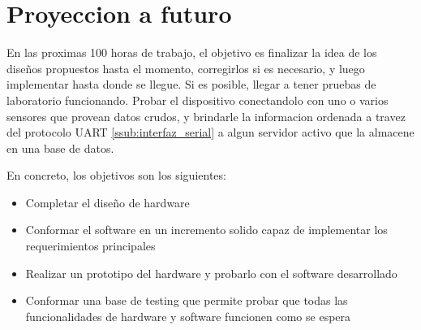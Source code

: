 \section{Proyeccion a futuro} %
\label{sec:proyeccion_a_futuro}

En las proximas 100 horas de trabajo, el objetivo es finalizar la idea de los diseños propuestos hasta el momento, corregirlos si es necesario, y luego implementar hasta donde se llegue. Si es posible, llegar a tener pruebas de laboratorio funcionando. Probar el dispositivo conectandolo con uno o varios sensores que provean datos crudos, y brindarle la informacion ordenada a travez del protocolo UART \ref{ssub:interfaz_serial} a algun servidor activo que la almacene en una base de datos.

En concreto, los objetivos son los siguientes:
\begin{itemize}
	\item Completar el diseño de hardware
	\item Conformar el software en un incremento solido capaz de implementar los requerimientos principales
	\item Realizar un prototipo del hardware y probarlo con el software desarrollado
	\item Conformar una base de testing que permite probar que todas las funcionalidades de hardware y software funcionen como se espera
\end{itemize}

